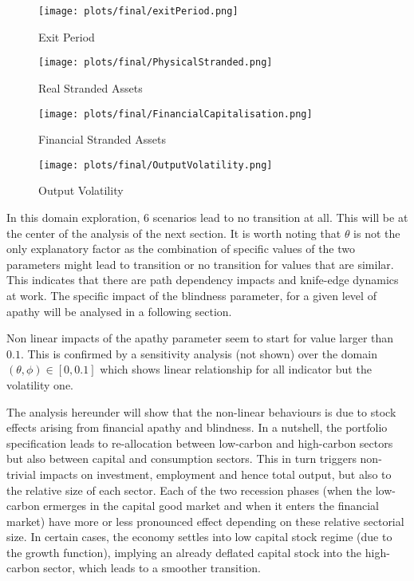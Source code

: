 \documentclass[]{article}
\begin{document}
\begin{figure}[htbp]
\centering
\texttt{[image: plots/final/exitPeriod.png]}
\caption{Exit Period}
\end{figure}

\begin{figure}[htbp]
\centering
\texttt{[image: plots/final/PhysicalStranded.png]}
\caption{Real Stranded Assets}
\end{figure}

\begin{figure}[htbp]
\centering
\texttt{[image: plots/final/FinancialCapitalisation.png]}
\caption{Financial Stranded Assets}
\end{figure}

\begin{figure}[htbp]
\centering
\texttt{[image: plots/final/OutputVolatility.png]}
\caption{Output Volatility}
\end{figure}

In this domain exploration, 6 scenarios lead to no transition at all.
This will be at the center of the analysis of the next section. It is
worth noting that \(\theta\) is not the only explanatory factor as the
combination of specific values of the two parameters might lead to
transition or no transition for values that are similar. This indicates
that there are path dependency impacts and knife-edge dynamics at work.
The specific impact of the blindness parameter, for a given level of
apathy will be analysed in a following section.

Non linear impacts of the apathy parameter seem to start for value
larger than \(0.1\). This is confirmed by a sensitivity analysis (not
shown) over the domain \((\theta,\phi)\in [0,0.1]\) which shows linear
relationship for all indicator but the volatility one.

The analysis hereunder will show that the non-linear behaviours is due
to stock effects arising from financial apathy and blindness. In a
nutshell, the portfolio specification leads to re-allocation between
low-carbon and high-carbon sectors but also between capital and
consumption sectors. This in turn triggers non-trivial impacts on
investment, employment and hence total output, but also to the relative
size of each sector. Each of the two recession phases (when the
low-carbon ermerges in the capital good market and when it enters the
financial market) have more or less pronounced effect depending on these
relative sectorial size. In certain cases, the economy settles into low
capital stock regime (due to the growth function), implying an already
deflated capital stock into the high-carbon sector, which leads to a
smoother transition.
\end{document}
